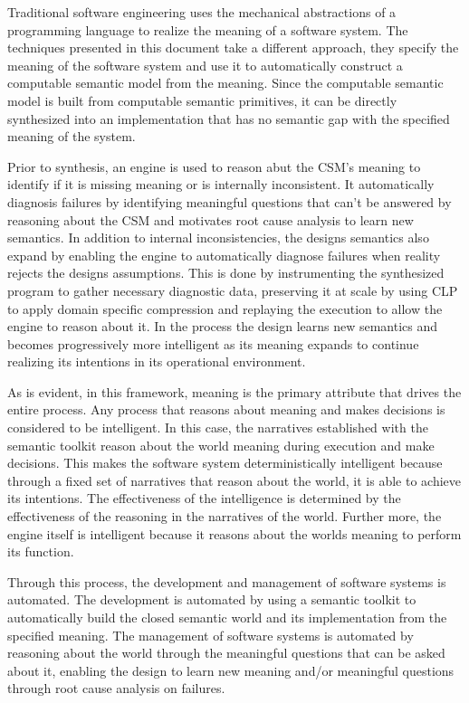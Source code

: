 Traditional software engineering uses the mechanical abstractions of a programming language to realize the meaning of a software system. The techniques presented in this document take a different approach, they specify the meaning of the software system and use it to automatically construct a computable semantic model from the meaning. Since the computable semantic model is built from computable semantic primitives, it can be directly synthesized into an implementation that has no semantic gap with the specified meaning of the system.

Prior to synthesis, an engine is used to reason abut the CSM's meaning to identify if it is missing meaning or is internally inconsistent. It automatically diagnosis failures by identifying meaningful questions that can't be answered by reasoning about the CSM and motivates root cause analysis to learn new semantics. In addition to internal inconsistencies, the designs semantics also expand by enabling the engine to automatically diagnose failures when reality rejects the designs assumptions. This is done by instrumenting the synthesized program to gather necessary diagnostic data, preserving it at scale by using CLP to apply domain specific compression and replaying the execution to allow the engine to reason about it. In the process the design learns new semantics and becomes progressively more intelligent as its meaning expands to continue realizing its intentions in its operational environment.

As is evident, in this framework, meaning is the primary attribute that drives the entire process. Any process that reasons about meaning and makes decisions is considered to be intelligent. In this case, the narratives established with the semantic toolkit reason about the world meaning during execution and make decisions. This makes the software system deterministically intelligent because through a fixed set of narratives that reason about the world, it is able to achieve its intentions. The effectiveness of the intelligence is determined by the effectiveness of the reasoning in the narratives of the world. Further more, the engine itself is intelligent because it reasons about the worlds meaning to perform its function. 

Through this process, the development and management of software systems is automated. The development is automated by using a semantic toolkit to automatically build the closed semantic world and its implementation from the specified meaning. The management of software systems is automated by reasoning about the world through the meaningful questions that can be asked about it, enabling the design to learn new meaning and/or meaningful questions through root cause analysis on failures.

